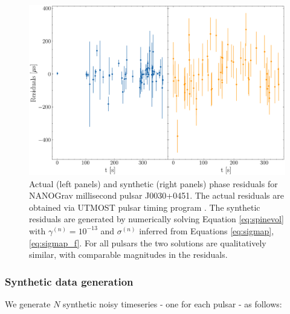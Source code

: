 \documentclass[fleqn,usenatbib,useAMS]{mnras}
\begin{document}
\begin{figure}
	\includegraphics[width=\columnwidth]{images/example_residuals_plot}
	\caption{Actual (left panels) and synthetic (right panels) phase residuals for NANOGrav millisecond pulsar J0030+0451. The actual residuals are obtained via UTMOST pulsar timing program \citep{UTMOST}. The synthetic residuals are generated by numerically solving Equation \eqref{eq:spinevol} with $\gamma^{(n)} = 10^{-13}$ and $\sigma^{(n)}$ inferred from Equations \eqref{eq:sigmap}, \eqref{eq:sigmap_f}. For all pulsars the two solutions are qualitatively similar, with comparable magnitudes in the residuals. }
	\label{fig:qualitative_compare}
\end{figure}
\subsubsection{Synthetic data generation}
We generate $N$ synthetic noisy timeseries - one for each pulsar - as follows:
\end{document}
